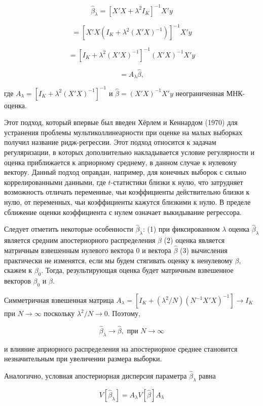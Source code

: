 \begin{equation}
\hat{\beta}_{\lambda}=[X'X+\lambda^{2}I_{K}]^{-1}X'y
\end{equation}

\[
=[X'X(I_{K}+\lambda^{2}(X'X)^{-1})]^{-1}X'y
\]

\[
=[I_{K}+\lambda^{2}(X'X)^{-1}]^{-1}(X'X)^{-1}X'y
\]

\[
=A_{\lambda}\hat{\beta},
\]

где $A_{\lambda}=[I_{K}+\lambda^{2}(X'X)^{-1}]^{-1}$ и $\hat{\beta}=(X'X)^{-1}X'y$ неограниченная МНК-оценка.

Этот подход, который впервые был введен Хёрлем и Кеннардом (1970) для устранения проблемы мультиколлинеарности при оценке на малых выборках получил название ридж-регрессии. Этот подход относится к задачам регуляризации, в которых дополнительно накладывается условие регулярности и оценка приближается к априорному среднему, в данном случае к нулевому вектору. Данный подход оправдан, например, для конечных выборок с сильно коррелированными данными, где $t$-статистики близки к нулю, что затрудняет возможность отличать переменные, чьи коэффициенты действительно близки к нулю, от переменных, чьи коэффициенты кажутся близкими к нулю. В пределе сближение оценки коэффициента с нулем означает выкидывание регрессора.

Следует отметить некоторые особенности $\hat{\beta}_{\lambda}$: (1) при фиксированном $\lambda$ оценка $\hat{\beta}_{\lambda}$ является средним апостериорного распределения $\beta$ (2) оценка является матричным взвешенным нулевого вектора $0$ и вектора $\hat{\beta}$ (3) вычисления практически не изменятся, если мы будем стягивать оценку к ненулевому $\beta$, скажем к $\beta_0$. Тогда, результирующая оценка будет матричным взвешенное векторов $\beta_0$ и $\hat{\beta}$.

Симметричная взвешенная матрица $A_{\lambda}=[I_{K}+(\lambda^{2}/N)(N^{-1}X'X)^{-1}]\rightarrow{I_K}$ при $N\rightarrow{\infty}$ поскольку $\lambda^{2}/N{\rightarrow}0$. Поэтому,

\[
\hat{\beta}_{\lambda}{\rightarrow}\hat{\beta}, \text{ при } N\rightarrow\infty
\]

и влияние  априорного распределения на апостериорное среднее становится незначительным при увеличении размера выборки.

Аналогично, условная апостериорная дисперсия параметра $\hat{\beta}_\lambda$ равна

\[
V[\hat{\beta}_{\lambda}]=A_{\lambda}V[\hat{\beta}]A_{\lambda}
\]

